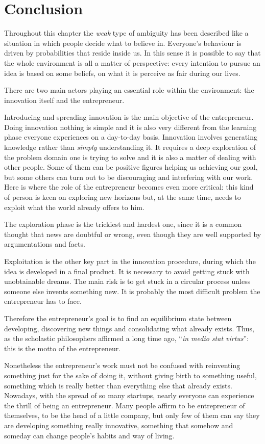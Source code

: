 \section{Conclusion}
Throughout this chapter the \textit{weak} type of ambiguity has been described like a situation in which people decide what to believe in. Everyone’s behaviour is driven by probabilities that reside inside us. In this sense it is possible to say that the whole environment is all a matter of perspective: every intention to pursue an idea is based on some beliefs, on what it is perceive as fair during our lives.

There are two main actors playing an essential role within the environment: the innovation itself and the entrepreneur.

Introducing and spreading innovation is the main objective of the entrepreneur. Doing innovation nothing is simple and it is also very different from the learning phase everyone experiences on a day-to-day basis. Innovation involves generating knowledge rather than \textit{simply} understanding it. It requires a deep exploration of the problem domain one is trying to solve and it is also a matter of dealing with other people. Some of them can be positive figures helping us achieving our goal, but some others can turn out to be discouraging and interfering with our work.
Here is where the role of the entrepreneur becomes even more critical: this kind of person is keen on exploring new horizons but, at the same time, needs to exploit what the world already offers to him.

The exploration phase is the trickiest and hardest one, since it is a common thought that news are doubtful or wrong, even though they are well supported by argumentations and facts.

Exploitation is the other key part in the innovation procedure, during which the idea is developed in a final product. It is necessary to avoid getting stuck with unobtainable dreams. The main risk is to get stuck in a circular process unless someone else invents something new. It is probably the most difficult problem the entrepreneur has to face.

Therefore the entrepreneur’s goal is to find an equilibrium state between developing, discovering new things and consolidating what already exists. Thus, as the scholastic philosophers affirmed a long time ago, ``\textit{in medio stat virtus}'': this is the motto of the entrepreneur.

Nonetheless the entrepreneur’s work must not be confused with reinventing something just for the sake of doing it, without giving birth to something useful, something which is really better than everything else that already exists. Nowadays, with the spread of so many startups, nearly everyone can experience the thrill of being an entrepreneur. Many people affirm to be entrepreneur of themselves, to be the head of a little company, but only few of them can say  they are developing something really innovative, something that somehow and someday can change people's habits and way of living.


